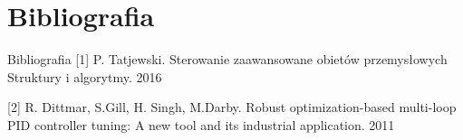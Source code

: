\section{Bibliografia}
\begin{frame}{Bibliografia}
[1] P. Tatjewski. Sterowanie zaawansowane obietów przemysłowych Struktury i algorytmy. 2016 

[2] R. Dittmar, S.Gill, H. Singh, M.Darby. Robust optimization-based multi-loop PID controller tuning: A new tool and its industrial application. 2011
\end{frame}